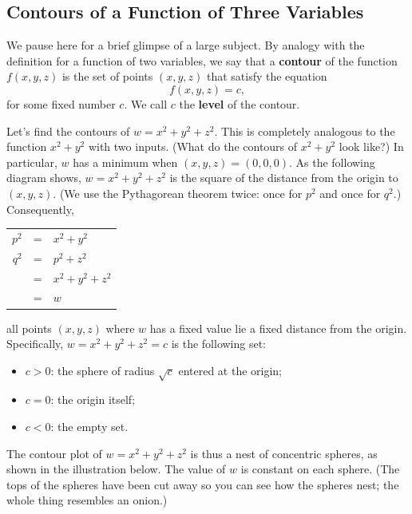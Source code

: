 {{{{\subsection{Contours of a Function of Three Variables}

	We pause here for a brief glimpse of a large subject.  By analogy with the definition for a function of two variables,
 we say that a {\bf contour} of the function $f(x, y, z)$ is the set of points $(x, y, z)$ that satisfy the equation      
	\[
f(x, y, z) = c,
\]
for some fixed number $c$.  We call $c$ the {\bf level} of the contour. 

	Let's find the contours of $w = x^2 + y^2 + z^2$.  
This is completely analogous to the function $x^2 + y^2$ with two inputs.  (What do the contours of $x^2 + y^2$ look like?)  In particular, $w$ has a minimum when $(x, y, z) = (0, 0, 0)$.   As the following diagram shows, $w = x^2 + y^2 + z^2$ is the square of the distance from the origin to $(x, y, z)$.  (We use the Pythagorean theorem twice: once for $p^2$ and once for $q^2$.)  Consequently, 
\linebreak

\vspace{15pt}
	   
	\hspace{180pt}


\begin{tabular}{rcl}
	$p^2$ &=& $x^2 + y^2$ \\ [3pt]
	$q^2$ &=& $p^2 + z^2$ \\
	      &=& $x^2 + y^2 + z^2$ \\
	      &=& $w$
	\end{tabular}
	
\newpage

\noindent
all points $(x, y, z)$ where $w$ has a fixed value lie a fixed distance from the origin.  Specifically, $w = x^2 + y^2 + z^2 = c$ is the following set:
	\begin{itemize}
\item $c > 0$: the sphere of radius $\sqrt{c}$ entered at the origin;
\item $c = 0$: the origin itself;
\item $c < 0$: the empty set.
\end{itemize}
The contour plot of $w = x^2 + y^2 + z^2$ is thus 
a nest of concentric spheres, as shown in the illustration below.   The value of $w$ is constant on each sphere.  (The tops of the spheres have been cut away so you can see how the spheres nest; the whole thing resembles an onion.) 

}}}}
